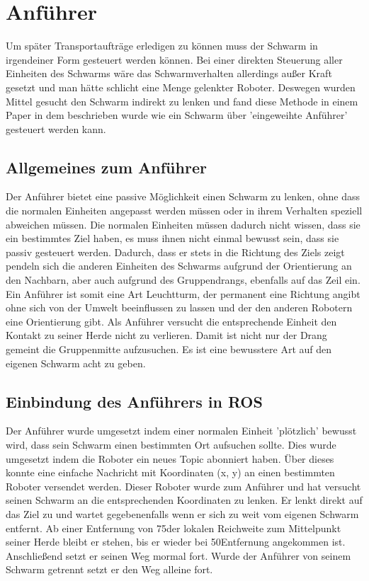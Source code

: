 \section{Anführer}

Um später Transportaufträge erledigen zu können muss der Schwarm in irgendeiner Form gesteuert werden können. Bei einer direkten Steuerung aller Einheiten des Schwarms wäre das Schwarmverhalten allerdings außer Kraft gesetzt und man hätte schlicht eine Menge gelenkter Roboter. Deswegen wurden Mittel gesucht den Schwarm indirekt zu lenken und fand diese Methode in einem Paper  in dem beschrieben wurde wie ein Schwarm über 'eingeweihte Anführer' gesteuert werden kann.

\subsection*{Allgemeines zum Anführer}

Der Anführer bietet eine passive Möglichkeit einen Schwarm zu lenken, ohne dass die normalen Einheiten angepasst werden müssen oder in ihrem Verhalten speziell abweichen müssen. Die normalen Einheiten müssen dadurch nicht wissen, dass sie ein bestimmtes Ziel haben, es muss ihnen nicht einmal bewusst sein, dass sie passiv gesteuert werden. Dadurch, dass er stets in die Richtung des Ziels zeigt pendeln sich die anderen Einheiten des Schwarms aufgrund der Orientierung an den Nachbarn, aber auch aufgrund des Gruppendrangs, ebenfalls auf das Zeil ein. Ein Anführer ist somit eine Art Leuchtturm, der permanent eine Richtung angibt ohne sich von der Umwelt beeinflussen zu lassen und der den anderen Robotern eine Orientierung gibt.
Als Anführer versucht die entsprechende Einheit den Kontakt zu seiner Herde nicht zu verlieren. Damit ist nicht nur der Drang gemeint die Gruppenmitte aufzusuchen. Es ist eine bewusstere Art auf den eigenen Schwarm acht zu geben.

\subsection*{Einbindung des Anführers in ROS}

Der Anführer wurde umgesetzt indem einer normalen Einheit 'plötzlich' bewusst wird, dass sein Schwarm einen bestimmten Ort aufsuchen sollte. Dies wurde umgesetzt indem die Roboter ein neues Topic abonniert haben. Über dieses konnte eine einfache Nachricht mit Koordinaten (x, y) an einen bestimmten Roboter versendet werden. Dieser Roboter wurde zum Anführer und hat versucht seinen Schwarm an die entsprechenden Koordinaten zu lenken. Er lenkt direkt auf das Ziel zu und wartet gegebenenfalls wenn er sich zu weit vom eigenen Schwarm entfernt. Ab einer Entfernung von 75\per der lokalen Reichweite zum Mittelpunkt seiner Herde bleibt er stehen, bis er wieder bei 50\per Entfernung angekommen ist. Anschließend setzt er seinen Weg mormal fort. Wurde der Anführer von seinem Schwarm getrennt setzt er den Weg alleine fort.

